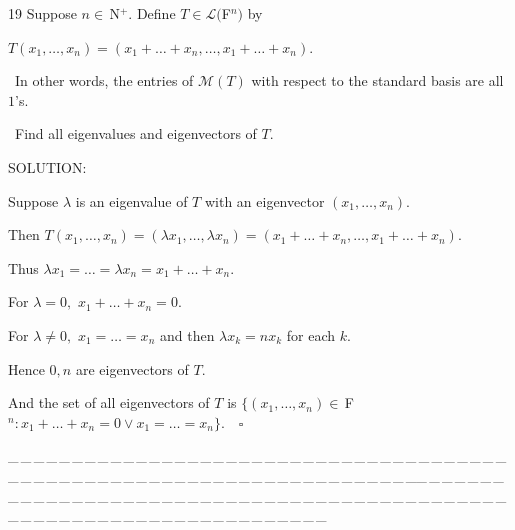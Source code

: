\documentclass[a4paper, 11pt, UTF8]{article}
\def\Lm{\mathcal{L}}
\def\Mt{\mathcal{M}}
\def\Fbfc{$\,{\timesbf F}$}
\def\Nbp{$\,{\timesbf N}$^+}
\begin{document}
\begin{large}
{\timesbf\Large 19} {\timessl\Large 
Suppose $n\in\Nbp$. Define $T\in\Lm(${\timesbf F}$^{n})$ by}\par
\centerline{\timessl\Large $T(x_1,\dots,x_n)=(x_1+\dots+x_n,\dots,x_1+\dots+x_n).$}\par\quad\,
{\timessl\Large In other words, the entries of $\Mt(T)$ with respect to the standard basis are all \,$1$'s.}\par\quad\,
{\timessl\Large Find all eigenvalues and eigenvectors of $T.$}\par
{\timesbf S\footnotesize{OLUTION:}}\par\quad
Suppose $\lambda$ is an eigenvalue of $T$ with an eigenvector $(x_1,\dots,x_n).$\par\quad
Then $T(x_1,\dots,x_n)=(\lambda x_1,\dots,\lambda x_n)=(x_1+\dots+x_n,\dots,x_1+\dots+x_n).$\par\quad
Thus $\lambda x_1=\dots=\lambda x_n=x_1+\dots+x_n.$\par\quad
For $\lambda=0,$ $x_1+\dots+x_n=0.$\par\quad
For $\lambda\neq 0,$ $x_1=\dots=x_n$ and then $\lambda x_k=n x_k$ for each $k.$\par\quad
Hence $0,n$ are eigenvectors of $T.$\par\quad
And the set of all eigenvectors of $T$ is $\{(x_1,\dots,x_n)\in\Fbfc^n:x_1+\dots+x_n=0\vee x_1=\dots=x_n\}.\quad\square$\par
{\tiny \_\,\_\,\_\,\_\,\_\,\_\,\_\,\_\,\_\,\_\,\_\,\_\,\_\,\_\,\_\,\_\,\_\,\_\,\_\,\_\,\_\,\_\,\_\,\_\,\_\,\_\,\_\,\_\,\_\,\_\,\_\,\_\,\_\,\_\,\_\,\_\,\_\,\_\,\_\,\_\,\_\,\_\,\_\,\_\,\_\,\_\,\_\,\_\,\_\,\_\,\_\,\_\,\_\,\_\,\_\,\_\,\_\,\_\,\_\,\_\,\_\,\_\,\_\,\_\,\_\,\_\,\_\,\_\,\_\,\_\,\_\_\,\_\,\_\,\_\,\_\,\_\,\_\,\_\,\_\,\_\,\_\,\_\,\_\,\_\,\_\,\_\,\_\,\_\,\_\,\_\,\_\,\_\,\_\,\_\,\_\,\_\,\_\,\_\,\_\,\_\,\_\,\_\,\_\,\_\,\_\,\_\,\_\,\_\,\_\,\_\,\_\,\_\,\_\,\_\,\_\,\_\,\_\,\_\,\_\,\_\,\_\,\_\,\_\,\_\,\_\,\_\,\_\,\_\,\_\,\_\,\_\,\_\,\_\,\_\,\_\,\_\,\_\,\_\,\_\,\_\,\_}\par


\end{large}
\end{document}
